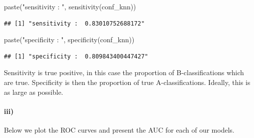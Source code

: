 \documentclass[
]{article}
\newenvironment{Shaded}{\begin{snugshade}}{\end{snugshade}}
\newcommand{\FunctionTok}[1]{\textcolor[rgb]{0.00,0.00,0.00}{#1}}
\newcommand{\NormalTok}[1]{#1}
\newcommand{\StringTok}[1]{\textcolor[rgb]{0.31,0.60,0.02}{#1}}
\begin{document}
\begin{Shaded}
\begin{Highlighting}[]
\FunctionTok{paste}\NormalTok{(}\StringTok{"sensitivity : "}\NormalTok{, }\FunctionTok{sensitivity}\NormalTok{(conf\_knn))}
\end{Highlighting}
\end{Shaded}

\begin{verbatim}
## [1] "sensitivity :  0.83010752688172"
\end{verbatim}

\begin{Shaded}
\begin{Highlighting}[]
\FunctionTok{paste}\NormalTok{(}\StringTok{"specificity : "}\NormalTok{, }\FunctionTok{specificity}\NormalTok{(conf\_knn))}
\end{Highlighting}
\end{Shaded}

\begin{verbatim}
## [1] "specificity :  0.809843400447427"
\end{verbatim}

Sensitivity is true positive, in this case the proportion of
B-classifications which are true. Specificity is then the proportion of
true A-classifications. Ideally, this is as large as possible.

\hypertarget{iii}{%
\paragraph{iii)}\label{iii}}

Below we plot the ROC curves and present the AUC for each of our models.
\end{document}
